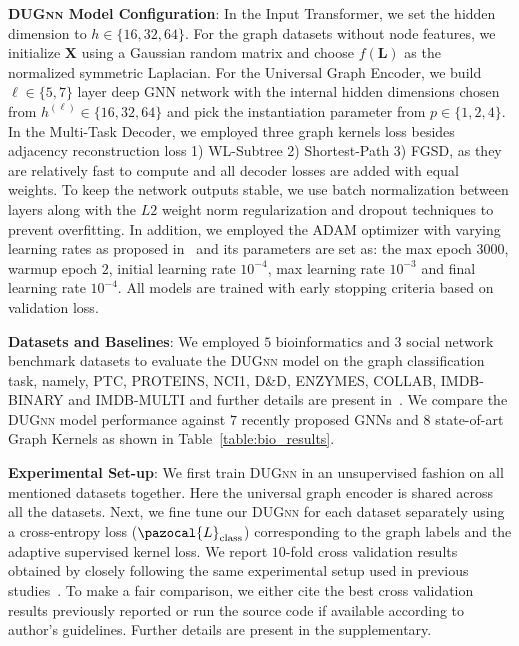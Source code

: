\documentclass{article}
\newcommand{\La}{\pazocal{L}}
\begin{document}
\noindent \textbf{\textsc{DUGnn} Model Configuration}: In the Input Transformer,  we set the hidden dimension  to $h\in\{16, 32, 64\}$. For  the graph datasets without node features, we initialize $\mathbf{X}$ using a Gaussian random matrix and  choose $f(\mathbf{L})$ as the normalized symmetric   Laplacian.
For the Universal Graph Encoder, we build $\ell\in\{5, 7\}$ layer deep GNN network with  the internal hidden dimensions chosen from $h^{(\ell)}\in\{16, 32, 64\}$ and pick the  instantiation parameter from $p\in \{1, 2, 4\}$.   In the  Multi-Task Decoder,  we employed  three graph kernels loss besides adjacency reconstruction loss  1) WL-Subtree   2) Shortest-Path     3) FGSD,   as they are relatively fast to compute and all decoder losses are added with equal weights.   To keep the network outputs stable, we use   batch normalization between   layers   along with the  $L2$ weight norm regularization and dropout  techniques to prevent overfitting.
In addition, we employed the ADAM optimizer with varying learning rates as proposed in~\cite{vaswani2017attention} and its parameters are set as: the max epoch  $3000$, warmup epoch $2$, initial learning rate $10^{-4}$, max learning rate  $10^{-3}$ and final learning rate $10^{-4}$. All models are trained with early stopping criteria based on validation loss.






\noindent \textbf{Datasets and Baselines}:  We employed  $5$  bioinformatics and $3$ social network benchmark  datasets to evaluate the \textsc{DUGnn} model on the graph classification  task, namely,   {\selectfont 
	PTC, PROTEINS, NCI1, D\&D, ENZYMES, COLLAB, IMDB-BINARY} and {\selectfont IMDB-MULTI} and further details are present in~\cite{yanardag2015deep}. We compare the \textsc{DUGnn} model performance against $7$ recently proposed   GNNs and $8$   state-of-art Graph Kernels as shown in Table~\ref{table:bio_results}. 

















\noindent \textbf{Experimental Set-up}: We first train \textsc{DUGnn} in an unsupervised fashion on   all mentioned datasets together. Here the universal graph encoder   is shared across all the datasets. Next, we fine tune our  \textsc{DUGnn} for each dataset separately using a  cross-entropy loss ($\La_{\text{class}}$) corresponding to the graph labels and the adaptive supervised kernel loss.  We report  $10$-fold cross validation results obtained by closely following the same experimental setup used in previous studies~\cite{ying2018hierarchical, xu2018powerful}.
To make a fair comparison, we either cite  the best cross validation results  previously reported   or run the source code if available according to author's guidelines.  Further   details  are   present in the supplementary. 
\end{document}
